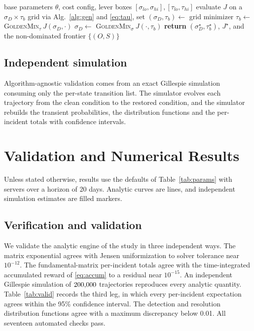 \documentclass[journal]{IEEEtran}
\begin{document}
\begin{algorithm}[t]
\caption{Detection and backup co-design}
\label{alg:codesign}
\begin{algorithmic}[1]
\REQUIRE base parameters $\theta$, cost config, lever boxes
$[\sigma_{lo},\sigma_{hi}],[\tau_{lo},\tau_{hi}]$
\STATE evaluate $J$ on a $\sigma_D\times\tau_b$ grid via
Alg.~\ref{alg:gen} and \eqref{eq:tau}, set $(\sigma_D,\tau_b)\gets$ grid minimizer
\REPEAT
  \STATE $\tau_b\gets$ \textsc{GoldenMin}$_{\tau}\ J(\sigma_D,\cdot)$
  \STATE $\sigma_D\gets$ \textsc{GoldenMin}$_{\sigma}\ J(\cdot,\tau_b)$
\STATE \textbf{return} $(\sigma_D^\star,\tau_b^\star)$, $J^\star$, and the
non-dominated frontier $\{(O,S)\}$
\end{algorithmic}
\end{algorithm}

\subsection{Independent simulation}
Algorithm-agnostic validation comes from an exact Gillespie
simulation~\cite{gillespie1977exact} consuming only the per-state transition
list. The simulator evolves each trajectory from the clean condition to the
restored condition, and the simulator rebuilds the transient probabilities, the
distribution functions and the per-incident totals with confidence intervals.

\section{Validation and Numerical Results}\label{sec:results}
Unless stated otherwise, results use the defaults of Table~\ref{tab:params} with
\Cm{} servers over a horizon of 20 days. Analytic curves are lines, and
independent simulation estimates are filled markers.

\subsection{Verification and validation}
We validate the analytic engine of the study in three independent ways. The matrix exponential agrees
with Jensen uniformization to solver tolerance near $10^{-12}$. The
fundamental-matrix per-incident totals agree with the time-integrated
accumulated reward of \eqref{eq:accum} to a residual near $10^{-15}$. An
independent Gillespie simulation of $200{,}000$ trajectories reproduces every
analytic quantity. Table~\ref{tab:valid} records the third leg, in which every
per-incident expectation agrees within the 95\% confidence interval. The
detection and resolution distribution functions agree with a maximum discrepancy
below 0.01. All seventeen automated checks pass.
\end{document}
